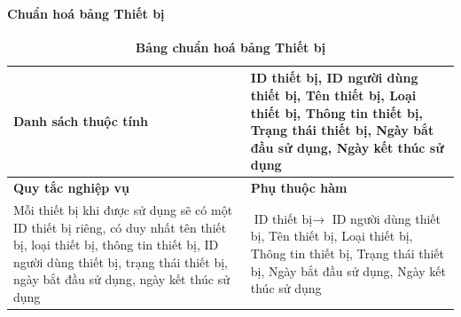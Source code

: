 \paragraph{Chuẩn hoá bảng Thiết bị}
\mbox{}
\begin{table}[H]
	\caption{\bfseries \fontsize{12pt}{0pt}\selectfont Bảng chuẩn hoá bảng Thiết bị}
	\centering
	\begin{tabularx}{0.9\textwidth}{|X|X|}
		\hline
		\textbf{Danh sách thuộc tính} & ID thiết bị, ID người dùng thiết bị, Tên thiết bị,
		Loại thiết bị, Thông tin thiết bị, Trạng thái thiết bị, Ngày bắt đầu sử dụng, Ngày kết thúc sử dụng                           \\
		\hline
		\textbf{Quy tắc nghiệp vụ}    & \textbf{Phụ thuộc hàm}                                                                        \\
		\hline
		Mỗi thiết bị khi được sử dụng sẽ có một ID thiết bị riêng, có duy nhất tên thiết bị, loại thiết bị, thông tin thiết bị,
		ID người dùng thiết bị, trạng thái thiết bị, ngày bắt đầu sử dụng, ngày kết thúc sử dụng
		                              & \parbox[t]{\linewidth}{$\text{ID thiết bị} \rightarrow$ ID người dùng thiết bị, Tên thiết bị,
		Loại thiết bị, Thông tin thiết bị, Trạng thái thiết bị, Ngày bắt đầu sử dụng, Ngày kết thúc sử dụng}                          \\
		\hline
		                                                   \\
		                                                             \\
		\hline
	\end{tabularx}
\end{table}

